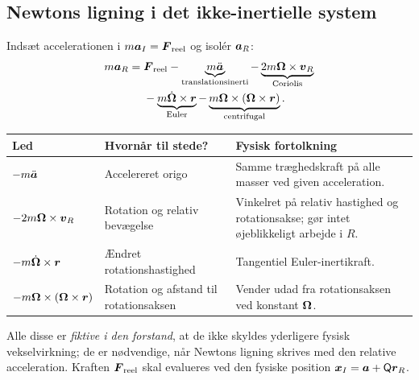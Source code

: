 \subsection{Newtons ligning i det ikke-inertielle system}
Indsæt accelerationen i $m\boldsymbol{a}_I=\boldsymbol{F}_{\rm reel}$ og isolér $\boldsymbol{a}_R$:
\begin{align*}
m\boldsymbol{a}_R={}&\boldsymbol{F}_{\rm reel}
-\underbrace{m\ddot{\boldsymbol{a}}}_{\text{translationsinerti}}
-\underbrace{2m\boldsymbol{\Omega}\times\boldsymbol{v}_R}_{\text{Coriolis}}\\
&-\underbrace{m\dot{\boldsymbol{\Omega}}\times\boldsymbol{r}}_{\text{Euler}}
-\underbrace{m\boldsymbol{\Omega}\times(\boldsymbol{\Omega}\times\boldsymbol{r})}_{\text{centrifugal}}.
\end{align*}
\begin{center}\small\renewcommand{\arraystretch}{1.15}
\begin{tabular}{p{31mm}p{49mm}p{54mm}}\toprule
\textbf{Led} & \textbf{Hvornår til stede?} & \textbf{Fysisk fortolkning}\\\midrule
$-m\ddot{\boldsymbol{a}}$ & Accelereret origo & Samme træghedskraft på alle masser ved given acceleration.\\
$-2m\boldsymbol{\Omega}\times\boldsymbol{v}_R$ & Rotation og relativ bevægelse & Vinkelret på relativ hastighed og rotationsakse; gør intet øjeblikkeligt arbejde i $R$.\\
$-m\dot{\boldsymbol{\Omega}}\times\boldsymbol{r}$ & Ændret rotationshastighed & Tangentiel Euler-inertikraft.\\
$-m\boldsymbol{\Omega}\times(\boldsymbol{\Omega}\times\boldsymbol{r})$ & Rotation og afstand til rotationsaksen & Vender udad fra rotationsaksen ved konstant $\boldsymbol{\Omega}$.\\\bottomrule
\end{tabular}\end{center}
Alle disse er \emph{fiktive i den forstand}, at de ikke skyldes yderligere fysisk vekselvirkning; de er nødvendige, når Newtons ligning skrives med den relative acceleration. Kraften $\boldsymbol{F}_{\rm reel}$ skal evalueres ved den fysiske position $\boldsymbol{x}_I=\boldsymbol{a}+\mathsf Q\boldsymbol{r}_R$.

